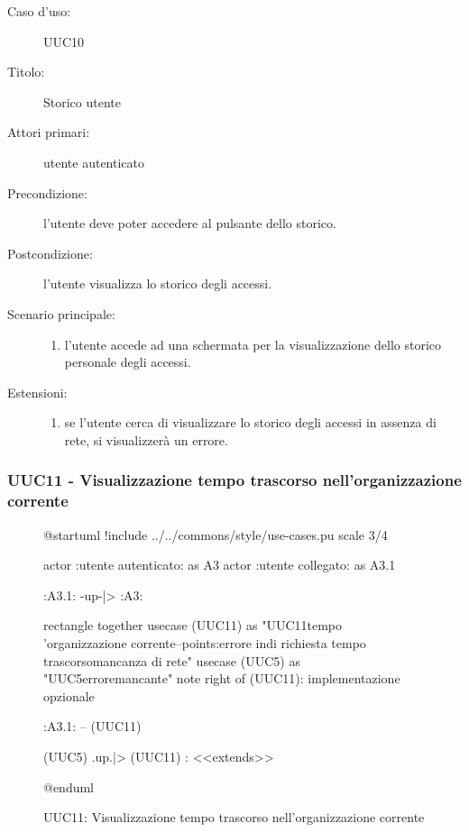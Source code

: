 \documentclass[casi-duso]{subfiles}
\begin{document}
\begin{description}
  \item[Caso d’uso:] UUC10
  \item[Titolo:] Storico utente
  \item[Attori primari:] utente autenticato
  \item[Precondizione:]  l'utente deve poter accedere al pulsante dello storico.
  \item[Postcondizione:] l'utente visualizza lo storico degli accessi.
  \item[Scenario principale:]
        \begin{enumerate}
          \item l'utente accede ad una schermata per la visualizzazione dello storico personale degli accessi.
        \end{enumerate}
  \item[Estensioni:]
        \begin{enumerate}
          \item se l'utente cerca di visualizzare lo storico degli accessi in assenza di rete, si visualizzerà un errore.
        \end{enumerate}
\end{description}

\subsubsection{UUC11 - Visualizzazione tempo trascorso nell'organizzazione corrente}%
\label{subsub:UUC11utente}

\begin{figure}[h!] 
  \centering 
  \begin{plantuml}
  @startuml
  !include ../../commons/style/use-cases.pu
  scale 3/4

  actor :utente autenticato: as A3
  actor :utente collegato: as A3.1

  :A3.1: -up-|> :A3:

  rectangle {
    together {
      usecase (UUC11) as "UUC11\nVisualizzazione tempo \nnell'organizzazione corrente\n--\nExtension points:\nVisualizzazione errore in\ncaso di richiesta tempo trascorso\nin mancanza di rete"
      usecase (UUC5) as "UUC5\nVisualizzazione errore\nrete mancante"
      note right of (UUC11): implementazione opzionale
    }
  }

  :A3.1: -- (UUC11)

  (UUC5) .up.|> (UUC11) : <<extends>>

  @enduml
  \end{plantuml} 
  \caption{UUC11: Visualizzazione tempo trascorso nell'organizzazione corrente} 
  \label{fig:uuc11} 
\end{figure}
\end{document}
